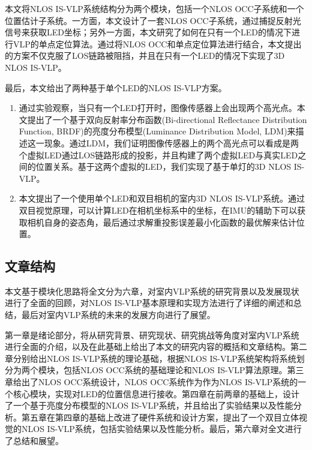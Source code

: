 本文将NLOS IS-VLP系统结构分为两个模块，包括一个NLOS OCC子系统和一个位置估计子系统。一方面，本文设计了一套NLOS OCC子系统，通过捕捉反射光信号来获取LED坐标；另外一方面，本文研究了如何在只有一个LED的情况下进行VLP的单点定位算法。通过将NLOS OCC和单点定位算法进行结合，本文提出的方案不仅克服了LOS链路被阻挡，并且在只有一个LED的情况下实现了3D NLOS IS-VLP。

最后，本文给出了两种基于单个LED的NLOS IS-VLP方案。

\begin{enumerate}[topsep = 0 pt, itemsep= 0 pt, parsep=0pt, partopsep=0pt, leftmargin=20pt, itemindent=0pt, labelsep=6pt, label={(\arabic*)}] 

    \item 通过实验观察，当只有一个LED打开时，图像传感器上会出现两个高光点。本文提出了一个基于双向反射率分布函数(Bi-directional Reflectance Distribution Function, BRDF)的亮度分布模型(Luminance Distribution Model, LDM)来描述这一现象。通过LDM，我们证明图像传感器上的两个高光点可以看成是两个虚拟LED通过LOS链路形成的投影，并且构建了两个虚拟LED与真实LED之间的位置关系。基于这两个虚拟的LED，我们实现了基于单灯的3D NLOS IS-VLP。
    \item 本文提出了一个使用单个LED和双目相机的室内3D NLOS IS-VLP系统。通过双目视觉原理，可以计算LED在相机坐标系中的坐标，在IMU的辅助下可以获取相机自身的姿态角，最后通过求解重投影误差最小化函数的最优解来估计位置。
\end{enumerate}



\subsection{文章结构}
本文基于模块化思路将全文分为六章，对室内VLP系统的研究背景以及发展现状进行了全面的回顾，对NLOS IS-VLP基本原理和实现方法进行了详细的阐述和总结，最后对室内VLP系统的未来的发展方向进行了展望。

第一章是绪论部分，将从研究背景、研究现状、研究挑战等角度对室内VLP系统进行全面的介绍，以及在此基础上给出了本文的研究内容的概括和文章结构。第二章分别给出NLOS IS-VLP系统的理论基础，根据NLOS IS-VLP系统架构将系统划分为两个模块，包括NLOS OCC系统的基础理论和NLOS IS-VLP算法原理。第三章给出了NLOS OCC系统设计，NLOS OCC系统作为作为NLOS IS-VLP系统的一个核心模块，实现对LED的位置信息进行接收。第四章在前两章的基础上，设计了一个基于亮度分布模型的NLOS IS-VLP系统，并且给出了实验结果以及性能分析。第五章在第四章的基础上改进了硬件系统和设计方案，提出了一个双目立体视觉的NLOS IS-VLP系统，包括实验结果以及性能分析。最后，第六章对全文进行了总结和展望。